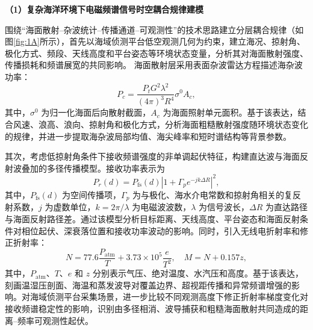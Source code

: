 \textbf{（1）复杂海洋环境下电磁频谱信号时空耦合规律建模}

围绕“海面散射--杂波统计--传播通道--可观测性”的技术思路建立分层耦合规律（如图\ref{fig:1A}所示），首先以海域侦测平台低空观测几何为约束，建立海况、掠射角、极化方式、频段、天线高度和平台姿态等环境状态变量，分析其对海面散射强度、传播损耗和频谱展宽的共同影响。
海面散射层采用表面杂波雷达方程描述海杂波功率：
\begin{equation}
	P_c =
	\frac{P_t G^2 \lambda^2}{(4\pi)^3 R^4}
	\sigma^0 A_c ,
\end{equation}
其中，$\sigma^0$ 为归一化海面后向散射截面，$A_c$ 为海面照射单元面积。基于该表达，结合风速、浪高、浪向、掠射角和极化方式，分析海面粗糙散射强度随环境状态变化的规律，并进一步提取海杂波局部均值、海尖峰率和短时谱结构等背景参数。

其次，考虑低掠射角条件下接收频谱强度的非单调起伏特征，构建直达波与海面反射波叠加的多径传播模型。接收功率表示为
\begin{equation}
	P_r(d)=
	P_{\mathrm{fs}}(d)
	\left|1+\Gamma_p e^{-jk\Delta R}\right|^2 ,
\end{equation}
其中，$P_{\mathrm{fs}}(d)$ 为空间传播项，$\Gamma_p$ 为与极化、海水介电常数和掠射角相关的复反射系数，$j$ 为虚数单位，$k=2\pi/\lambda$ 为电磁波波数，$\lambda$ 为信号波长，$\Delta R$ 为直达路径与海面反射路径差。通过该模型分析目标距离、天线高度、平台姿态和海面反射条件对相位起伏、深衰落位置和接收功率波动的影响。同时，引入无线电折射率和修正折射率：
\begin{equation}
	N=77.6\frac{P_{\mathrm{atm}}}{T}+3.73\times10^5\frac{e}{T^2},
	\quad
	M=N+0.157z ,
\end{equation}
其中，$P_{\mathrm{atm}}$、$T$、$e$ 和 $z$ 分别表示气压、绝对温度、水汽压和高度。基于该表达，刻画温湿压剖面、海温和蒸发波导对覆盖边界、超视距传播和异常频谱增强的影响。对海域侦测平台采集场景，进一步比较不同观测高度下修正折射率梯度变化对接收频谱稳定性的影响，识别由多径相消、波导捕获和粗糙海面散射共同造成的距离--频率可观测性起伏。

